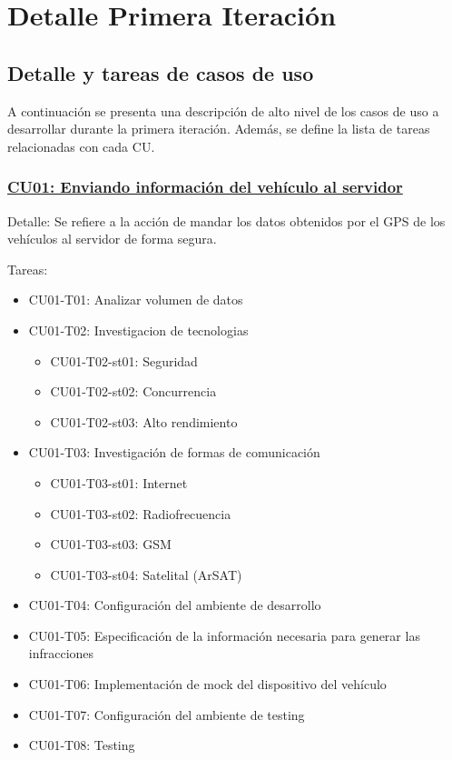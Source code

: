 \section{Detalle Primera Iteración}

\subsection{Detalle y tareas de casos de uso}

A continuación se presenta una descripción de alto nivel de los casos de uso a 
desarrollar durante la primera iteración. Además, se define la lista de tareas 
relacionadas con cada CU.

\subsubsection{\underline{CU01: Enviando información del vehículo al servidor}}

Detalle: Se refiere a la acción de mandar los datos obtenidos por el GPS de los 
vehículos al servidor de forma segura.


Tareas: 
\begin{itemize}

\item CU01-T01: Analizar volumen de datos

\item CU01-T02: Investigacion de tecnologias
\begin{itemize}
\item CU01-T02-st01: Seguridad
\item CU01-T02-st02: Concurrencia
\item CU01-T02-st03: Alto rendimiento
\end{itemize}

\item CU01-T03: Investigación de formas de comunicación
\begin{itemize}
\item CU01-T03-st01: Internet
\item CU01-T03-st02: Radiofrecuencia
\item CU01-T03-st03: GSM
\item CU01-T03-st04: Satelital (ArSAT)
\end{itemize}

\item CU01-T04: Configuración del ambiente de desarrollo 
\item CU01-T05: Especificación de la información necesaria para generar las infracciones 
\item CU01-T06: Implementación de mock del dispositivo del vehículo 
\item CU01-T07: Configuración del ambiente de testing 
\item CU01-T08: Testing 

\end{itemize}

